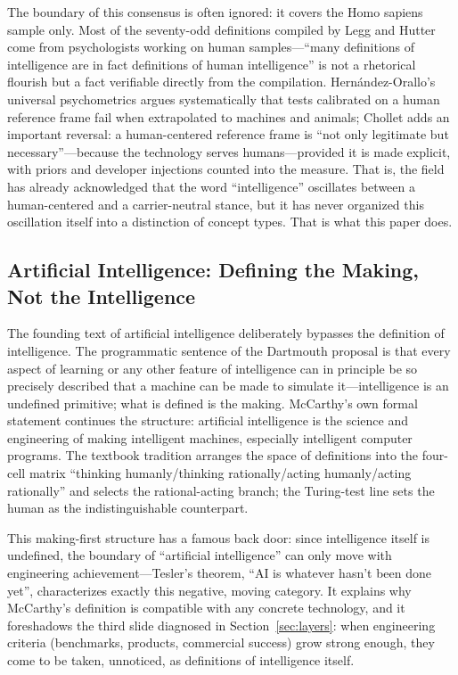 \documentclass[10pt]{article}
\begin{document}
The boundary of this consensus is often ignored: it covers the Homo sapiens sample only. Most of the seventy-odd definitions compiled by Legg and Hutter come from psychologists working on human samples---``many definitions of intelligence are in fact definitions of human intelligence'' is not a rhetorical flourish but a fact verifiable directly from the compilation\cite{legg2007definitions}. Hern\'andez-Orallo's universal psychometrics argues systematically that tests calibrated on a human reference frame fail when extrapolated to machines and animals\cite{hernandezorallo2017measure}; Chollet adds an important reversal: a human-centered reference frame is ``not only legitimate but necessary''---because the technology serves humans---provided it is made explicit, with priors and developer injections counted into the measure\cite{chollet2019measure}. That is, the field has already acknowledged that the word ``intelligence'' oscillates between a human-centered and a carrier-neutral stance, but it has never organized this oscillation itself into a distinction of concept types. That is what this paper does.

\subsection{Artificial Intelligence: Defining the Making, Not the Intelligence}

The founding text of artificial intelligence deliberately bypasses the definition of intelligence. The programmatic sentence of the Dartmouth proposal is that every aspect of learning or any other feature of intelligence can in principle be so precisely described that a machine can be made to simulate it\cite{mccarthy1955dartmouth}---intelligence is an undefined primitive; what is defined is the making. McCarthy's own formal statement continues the structure: artificial intelligence is the science and engineering of making intelligent machines, especially intelligent computer programs\cite{mccarthy2007whatis}. The textbook tradition arranges the space of definitions into the four-cell matrix ``thinking humanly/thinking rationally/acting humanly/acting rationally'' and selects the rational-acting branch\cite{russell2021aima}; the Turing-test line sets the human as the indistinguishable counterpart\cite{turing1950computing}.

This making-first structure has a famous back door: since intelligence itself is undefined, the boundary of ``artificial intelligence'' can only move with engineering achievement---Tesler's theorem, ``AI is whatever hasn't been done yet''\cite{tesler1997effect}, characterizes exactly this negative, moving category. It explains why McCarthy's definition is compatible with any concrete technology, and it foreshadows the third slide diagnosed in Section~\ref{sec:layers}: when engineering criteria (benchmarks, products, commercial success) grow strong enough, they come to be taken, unnoticed, as definitions of intelligence itself.
\end{document}
